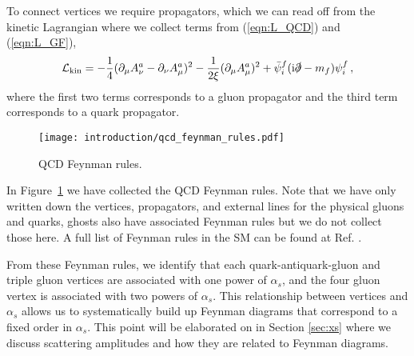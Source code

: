 \documentclass[main.tex]{subfiles}
\begin{document}
    To connect vertices we require propagators, which
    we can read off from the kinetic Lagrangian where
    we collect terms from (\ref{eqn:L_QCD}) and (\ref{eqn:L_GF}), 
    \begin{equation}\label{L_kin}
        \mathcal{L}_{\mathrm{kin}} = -\dfrac{1}{4}(\partial_{\mu}A^{a}_{\nu}-\partial_{\nu}A^{a}_{\mu})^{2} - \dfrac{1}{2\xi}(\partial_{\mu}A^{a}_{\mu})^{2} + \bar{\psi}_{i}^{f}(\mathrm{i}\slashed{\partial}-m_{f})\psi_{i}^{f} \, ,
    \end{equation}
    where the first two terms corresponds to a gluon
    propagator and the third term corresponds to
    a quark propagator.

    \begin{figure}
        \texttt{[image: introduction/qcd\_feynman\_rules.pdf]}
        \caption{QCD Feynman rules.}
        \label{fig:qcd_feynman_rules}
    \end{figure}

    In Figure~\ref{fig:qcd_feynman_rules} we have
    collected the QCD Feynman rules.
    Note that we have only written down the vertices,
    propagators, and external lines for the physical gluons and quarks,
    ghosts also have associated Feynman rules but we do
    not collect those here. A full list of Feynman rules
    in the SM can be found at Ref. \cite{Romao:2012pq}.

    From these Feynman rules, we identify that each
    quark-antiquark-gluon and triple gluon vertices
    are associated with one power of $\alpha_{s}$,
    and the four gluon vertex is associated with
    two powers of $\alpha_{s}$. This relationship
    between vertices and $\alpha_{s}$ allows
    us to systematically build up Feynman diagrams
    that correspond to a fixed order in $\alpha_{s}$.
    This point will be elaborated on in Section
    \ref{sec:xs} where we discuss scattering amplitudes
    and how they are related to Feynman diagrams.
\end{document}
